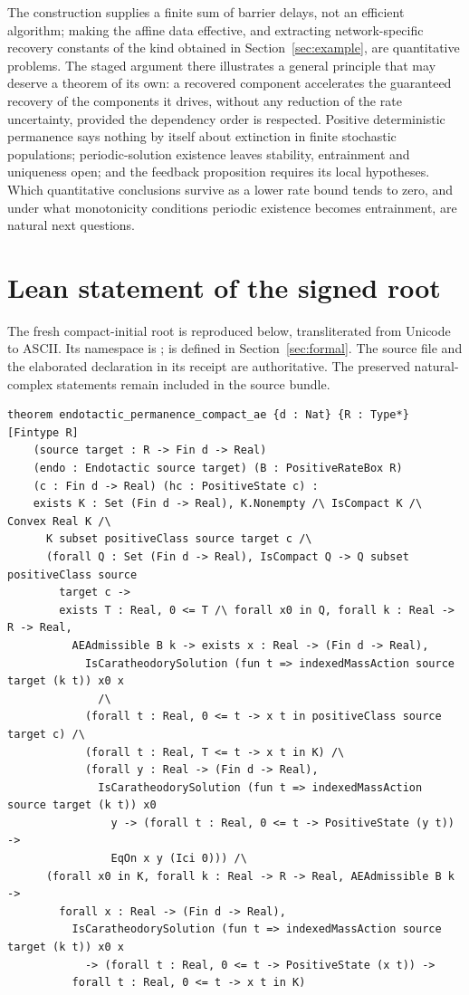 \documentclass[11pt]{article}
\theoremstyle{definition}
\theoremstyle{remark}
\begin{document}
The construction supplies a finite sum of barrier delays, not an efficient
algorithm; making the affine data effective, and extracting network-specific
recovery constants of the kind obtained in Section~\ref{sec:example}, are
quantitative problems. The staged argument there illustrates a general principle
that may deserve a theorem of its own: a recovered component accelerates the
guaranteed recovery of the components it drives, without any reduction of the
rate uncertainty, provided the dependency order is respected. Positive
deterministic permanence says nothing by itself about extinction in finite
stochastic populations; periodic-solution existence leaves stability,
entrainment and uniqueness open; and the feedback proposition requires its local
hypotheses. Which quantitative conclusions survive as a lower rate bound tends to
zero, and under what monotonicity conditions periodic existence becomes
entrainment, are natural next questions.

\appendix
\section{Lean statement of the signed root}\label{app:lean}
The fresh compact-initial root is reproduced below, transliterated from Unicode
to ASCII. Its namespace is ;
 is defined in Section~\ref{sec:formal}. The source file and
the elaborated declaration in its receipt are authoritative. The preserved
natural-complex statements remain included in the source bundle.
{\scriptsize\begin{verbatim}
theorem endotactic_permanence_compact_ae {d : Nat} {R : Type*} [Fintype R]
    (source target : R -> Fin d -> Real)
    (endo : Endotactic source target) (B : PositiveRateBox R)
    (c : Fin d -> Real) (hc : PositiveState c) :
    exists K : Set (Fin d -> Real), K.Nonempty /\ IsCompact K /\ Convex Real K /\
      K subset positiveClass source target c /\
      (forall Q : Set (Fin d -> Real), IsCompact Q -> Q subset positiveClass source
        target c ->
        exists T : Real, 0 <= T /\ forall x0 in Q, forall k : Real -> R -> Real,
          AEAdmissible B k -> exists x : Real -> (Fin d -> Real),
            IsCaratheodorySolution (fun t => indexedMassAction source target (k t)) x0 x
              /\
            (forall t : Real, 0 <= t -> x t in positiveClass source target c) /\
            (forall t : Real, T <= t -> x t in K) /\
            (forall y : Real -> (Fin d -> Real),
              IsCaratheodorySolution (fun t => indexedMassAction source target (k t)) x0
                y -> (forall t : Real, 0 <= t -> PositiveState (y t)) ->
                EqOn x y (Ici 0))) /\
      (forall x0 in K, forall k : Real -> R -> Real, AEAdmissible B k ->
        forall x : Real -> (Fin d -> Real),
          IsCaratheodorySolution (fun t => indexedMassAction source target (k t)) x0 x
            -> (forall t : Real, 0 <= t -> PositiveState (x t)) ->
          forall t : Real, 0 <= t -> x t in K)
\end{verbatim}}



\end{document}
